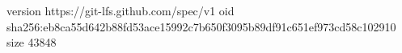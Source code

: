 version https://git-lfs.github.com/spec/v1
oid sha256:eb8ca55d642b88fd53ace15992c7b650f3095b89df91c651ef973cd58c102910
size 43848
